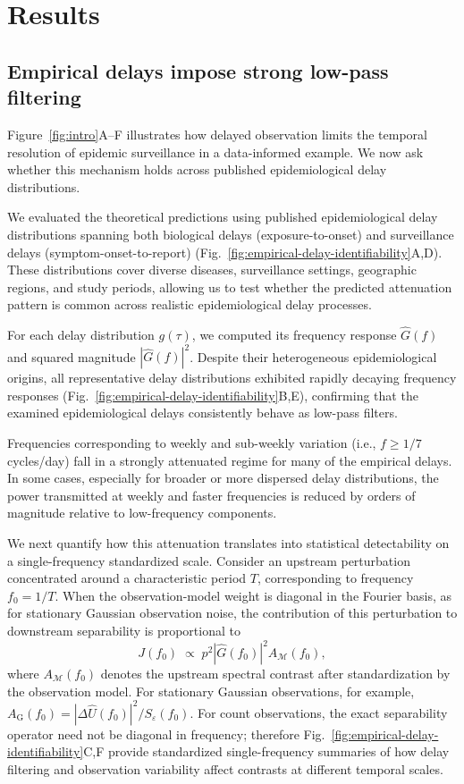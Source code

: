 \section*{Results}

\subsection*{Empirical delays impose strong low-pass filtering}
Figure~\ref{fig:intro}A--F illustrates how delayed observation limits the temporal resolution of epidemic surveillance in a data-informed example. We now ask whether this mechanism holds across published epidemiological delay distributions.


We evaluated the theoretical predictions using published epidemiological delay distributions spanning both biological delays (exposure-to-onset) and surveillance delays (symptom-onset-to-report) (Fig.~\ref{fig:empirical-delay-identifiability}A,D). These distributions cover diverse diseases, surveillance settings, geographic regions, and study periods, allowing us to test whether the predicted attenuation pattern is common across realistic epidemiological delay processes.

For each delay distribution \(g(\tau)\), we computed its frequency response \(\widehat G(f)\) and squared magnitude \(|\widehat G(f)|^2\). Despite their heterogeneous epidemiological origins, all representative delay distributions exhibited rapidly decaying frequency responses (Fig.~\ref{fig:empirical-delay-identifiability}B,E), confirming that the examined epidemiological delays consistently behave as low-pass filters.

Frequencies corresponding to weekly and sub-weekly variation (i.e., $f \geq 1/7$ cycles/day) fall in a strongly attenuated regime for many of the empirical delays. In some cases, especially for broader or more dispersed delay distributions, the power transmitted at weekly and faster frequencies is reduced by orders of magnitude relative to low-frequency components.

We next quantify how this attenuation translates into statistical detectability on a single-frequency standardized scale. Consider an upstream perturbation concentrated around a characteristic period \(T\), corresponding to frequency \(f_0 = 1/T\). When the observation-model weight is diagonal in the Fourier basis, as for stationary Gaussian observation noise, the contribution of this perturbation to downstream separability is proportional to
\[
    J(f_0) 
    \;\propto\; 
    p^2 |\widehat G(f_0)|^2 
    A_{\mathcal M}(f_0),
\]
where \(A_{\mathcal M}(f_0)\) denotes the upstream spectral contrast after standardization by the observation model. For stationary Gaussian observations, for example, \(A_{\mathrm G}(f_0)=|\Delta\widehat U(f_0)|^2/S_\varepsilon(f_0)\). For count observations, the exact separability operator need not be diagonal in frequency; therefore Fig.~\ref{fig:empirical-delay-identifiability}C,F provide standardized single-frequency summaries of how delay filtering and observation variability affect contrasts at different temporal scales.

